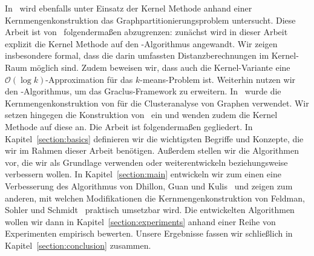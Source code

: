 In~\cite{Swierkot08} wird ebenfalls unter Einsatz der Kernel Methode anhand einer Kernmengenkonstruktion das
Graphpartitionierungsproblem untersucht. Diese Arbeit ist von~\cite{Swierkot08} folgendermaßen abzugrenzen: zunächst wird in dieser
Arbeit explizit die Kernel Methode auf den \kmpp-Algorithmus angewandt. Wir zeigen insbesondere formal, dass die darin umfassten
Distanzberechnungen im Kernel-Raum möglich sind. Zudem beweisen wir, dass auch die Kernel-Variante \kkmpp{} eine
$\mathcal{O}(\log k)$-Approximation für das $k$-means-Problem ist. Weiterhin nutzen wir den \kkmpp-Algorithmus, um das
Graclus-Framework zu erweitern. In~\cite{Swierkot08} wurde die Kernmengenkonstruktion von \Skmpp{} für die Clusteranalyse von
Graphen verwendet. Wir setzen hingegen die Konstruktion von~\cite{FeldmanSS13} ein und wenden zudem die Kernel Methode auf
diese an.
\absatz
Die Arbeit ist folgendermaßen gegliedert. In Kapitel~\ref{section:basics} definieren wir die wichtigsten Begriffe und
Konzepte, die wir im Rahmen dieser Arbeit benötigen. Außerdem stellen wir die Algorithmen vor, die wir als Grundlage verwenden
oder weiterentwickeln beziehungsweise verbessern wollen. In Kapitel~\ref{section:main} entwickeln wir zum einen eine
Verbesserung des Algorithmus von Dhillon, Guan und Kulis~\cite{DhillonGK04,DhillonGK07} und zeigen zum anderen, mit welchen
Modifikationen die Kernmengenkonstruktion von Feldman, Sohler und Schmidt~\cite{FeldmanSS13,Schmidt14} praktisch umsetzbar wird.
Die entwickelten Algorithmen wollen wir dann in Kapitel~\ref{section:experiments} anhand einer Reihe von Experimenten empirisch
bewerten. Unsere Ergebnisse fassen wir schließlich in Kapitel~\ref{section:conclusion} zusammen.